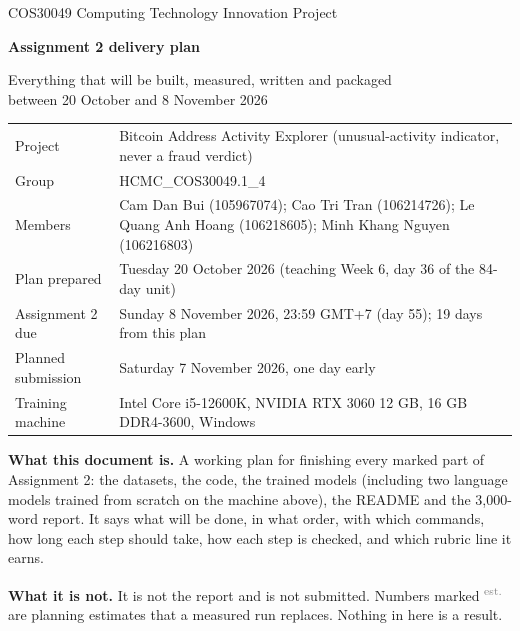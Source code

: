 \documentclass[a4paper,11pt]{article}
\newcommand{\est}{\textsuperscript{\textcolor{grey}{est.}}}
\begin{document}
\begin{titlepage}
\thispagestyle{empty}
\vspace*{1.5cm}
{\color{grey}\large COS30049 Computing Technology Innovation Project}\par
\vspace{0.4cm}
{\color{ink}\Huge\bfseries Assignment 2 delivery plan}\par
\vspace{0.3cm}
{\color{ink}\Large Everything that will be built, measured, written and packaged\\ between 20 October and 8 November 2026}\par
\vspace{1.2cm}
\begin{tabularx}{\textwidth}{@{}L{4.2cm}Y@{}}
\toprule
Project & Bitcoin Address Activity Explorer (unusual-activity indicator, never a fraud verdict) \\
Group & HCMC\_COS30049.1\_4 \\
Members & Cam Dan Bui (105967074); Cao Tri Tran (106214726); Le Quang Anh Hoang (106218605); Minh Khang Nguyen (106216803) \\
Plan prepared & Tuesday 20 October 2026 (teaching Week 6, day 36 of the 84-day unit) \\
Assignment 2 due & Sunday 8 November 2026, 23:59 GMT+7 (day 55); 19 days from this plan \\
Planned submission & Saturday 7 November 2026, one day early \\
Training machine & Intel Core i5-12600K, NVIDIA RTX 3060 12 GB, 16 GB DDR4-3600, Windows \\
\bottomrule
\end{tabularx}

\vspace{1cm}
\begin{summarybox}
\textbf{What this document is.} A working plan for finishing every marked part of Assignment 2: the
datasets, the code, the trained models (including two language models trained from scratch on the
machine above), the README and the 3,000-word report. It says what will be done, in what order, with
which commands, how long each step should take, how each step is checked, and which rubric line it
earns.

\textbf{What it is not.} It is not the report and is not submitted. Numbers marked \est{} are
planning estimates that a measured run replaces. Nothing in here is a result.


\end{summarybox}
\end{titlepage}
\end{document}
